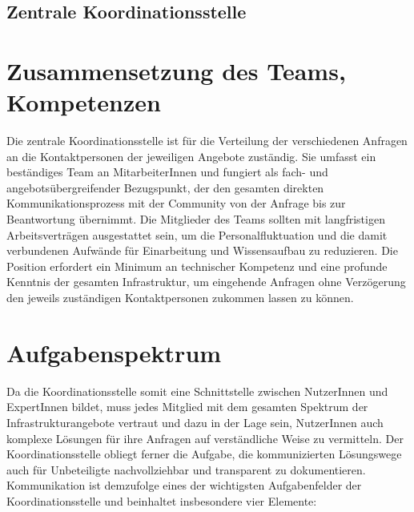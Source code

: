 \documentclass[a4paper,
fontsize=11pt,
oneside,
numbers=noperiodatend,
parskip=half-,
bibliography=totoc,
final
]{scrartcl}
\begin{document}
\hypertarget{zentrale-koordinationsstelle}{%
\subsection{Zentrale
Koordinationsstelle}\label{zentrale-koordinationsstelle}}

\hypertarget{zusammensetzung-des-teams-kompetenzen}{%
\section{Zusammensetzung des Teams,
Kompetenzen}\label{zusammensetzung-des-teams-kompetenzen}}

Die zentrale Koordinationsstelle ist für die Verteilung der
verschiedenen Anfragen an die Kontaktpersonen der jeweiligen Angebote
zuständig. Sie umfasst ein beständiges Team an MitarbeiterInnen und
fungiert als fach- und angebotsübergreifender Bezugspunkt, der den
gesamten direkten Kommunikationsprozess mit der Community von der
Anfrage bis zur Beantwortung übernimmt. Die Mitglieder des Teams sollten
mit langfristigen Arbeitsverträgen ausgestattet sein, um die
Personalfluktuation und die damit verbundenen Aufwände für Einarbeitung
und Wissensaufbau zu reduzieren. Die Position erfordert ein Minimum an
technischer Kompetenz und eine profunde Kenntnis der gesamten
Infrastruktur, um eingehende Anfragen ohne Verzögerung den jeweils
zuständigen Kontaktpersonen zukommen lassen zu können.

\hypertarget{aufgabenspektrum}{%
\section{Aufgabenspektrum}\label{aufgabenspektrum}}

Da die Koordinationsstelle somit eine Schnittstelle zwischen NutzerInnen
und ExpertInnen bildet, muss jedes Mitglied mit dem gesamten Spektrum
der Infrastrukturangebote vertraut und dazu in der Lage sein,
NutzerInnen auch komplexe Lösungen für ihre Anfragen auf verständliche
Weise zu vermitteln. Der Koordinationsstelle obliegt ferner die Aufgabe,
die kommunizierten Lösungswege auch für Unbeteiligte nachvollziehbar und
transparent zu dokumentieren. Kommunikation ist demzufolge eines der
wichtigsten Aufgabenfelder der Koordinationsstelle und beinhaltet
insbesondere vier Elemente:
\end{document}
